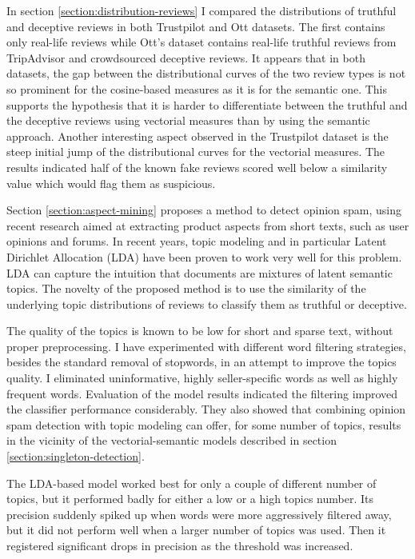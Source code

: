 In section \ref{section:distribution-reviews} I compared the distributions of truthful and deceptive reviews in both Trustpilot and Ott datasets. The first contains only real-life reviews while Ott's dataset contains real-life truthful reviews from TripAdvisor and crowdsourced deceptive reviews. It appears that in both datasets, the gap between the distributional curves of the two review types is not so prominent for the cosine-based measures as it is for the semantic one. This supports the hypothesis that it is harder to differentiate between the truthful and the deceptive reviews using vectorial measures than by using the semantic approach. Another interesting aspect observed in the Trustpilot dataset is the steep initial jump of the distributional curves for the vectorial measures. The results indicated half of the known fake reviews scored well below a similarity value which would flag them as suspicious.

Section \ref{section:aspect-mining} proposes a method to detect opinion spam, using recent research aimed at extracting product aspects from short texts, such as user opinions and forums. In recent years, topic modeling and in particular Latent Dirichlet Allocation (LDA) have been proven to work very well for this problem. LDA can capture the intuition that documents are mixtures of latent semantic topics. The novelty of the proposed method is to use the similarity of the underlying topic distributions of reviews to classify them as truthful or deceptive.

The quality of the topics is known to be low for short and sparse text, without proper preprocessing. I have experimented with different word filtering strategies, besides the standard removal of stopwords, in an attempt to improve the topics quality. I eliminated uninformative, highly seller-specific words as well as highly frequent words. Evaluation of the model results indicated the filtering improved the classifier performance considerably. 
They also showed that combining opinion spam detection with topic modeling can offer, for some number of topics, results in the vicinity of the vectorial-semantic models described in section \ref{section:singleton-detection}. 

The LDA-based model worked best for only a couple of different number of topics, but it performed badly for either a low or a high topics number. Its precision suddenly spiked up when words were more aggressively filtered away, but it did not perform well when a larger number of topics was used. Then it registered significant drops in precision as the threshold was increased.

